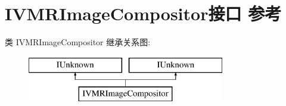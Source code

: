 \hypertarget{interface_i_v_m_r_image_compositor}{}\section{I\+V\+M\+R\+Image\+Compositor接口 参考}
\label{interface_i_v_m_r_image_compositor}
类 I\+V\+M\+R\+Image\+Compositor 继承关系图\+:\begin{figure}[H]
\begin{center}
\leavevmode
\includegraphics[height=2.000000cm]{interface_i_v_m_r_image_compositor}
\end{center}
\end{figure}
